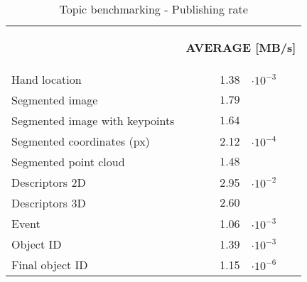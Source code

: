 \begin{itemize}
\begin{table}[H]
\centering
\caption[Topic benchmarking - Publishing rate]{Topic benchmarking - Publishing rate}
\begin{tabular} {l  l r@{}l }
\toprule
\addlinespace[3mm]
   \multicolumn{1}{c}{\begin{center}\textbf{TOPIC}\end{center}} &
   \multicolumn{3}{c}{\begin{flushright}\textbf{AVERAGE [MB/s]}\end{flushright}} &\\
\addlinespace[-3mm]
\midrule

Hand location && 1.38 & $\cdot10^{-3}$ \\
Segmented image && $1.79$\\
Segmented image with keypoints && $1.64$\\
Segmented coordinates (px) && 2.12&$\cdot10^{-4}$\\
Segmented point cloud && $1.48$\\
Descriptors 2D && 2.95&$\cdot10^{-2}$\\
Descriptors 3D && $2.60$\\
Event && 1.06&$\cdot10^{-3}$\\
Object ID && 1.39&$\cdot10^{-3}$\\
Final object ID && 1.15&$\cdot10^{-6}$\\
\bottomrule
\end{tabular}
\label{hz}
\end{table}


	\end{itemize}